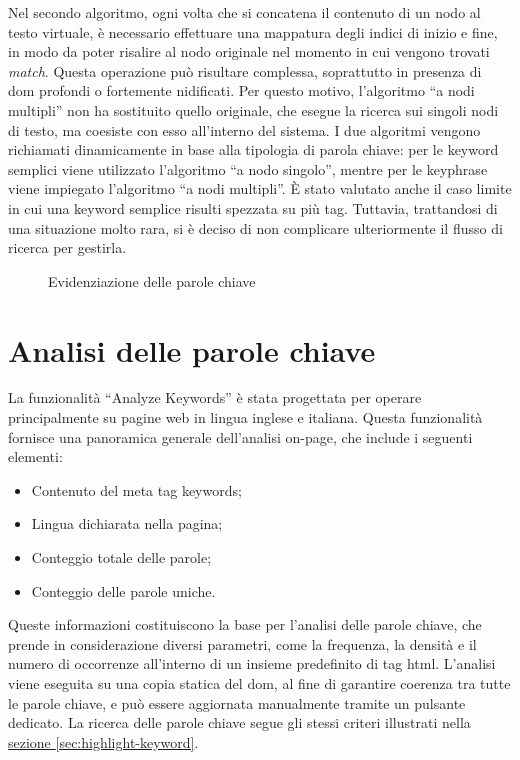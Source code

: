 \vspace{10pt}
\par\noindent Nel secondo algoritmo, ogni volta che si concatena il contenuto di un nodo al testo virtuale, è necessario effettuare una mappatura degli indici di inizio e fine, in modo da poter risalire al nodo originale nel momento in cui vengono trovati \textit{match}. Questa operazione può risultare complessa, soprattutto in presenza di \gls{dom} profondi o fortemente nidificati. Per questo motivo, l’algoritmo “a nodi multipli” non ha sostituito quello originale, che esegue la ricerca sui singoli nodi di testo, ma coesiste con esso all’interno del sistema. I due algoritmi vengono richiamati dinamicamente in base alla tipologia di parola chiave: per le keyword semplici viene utilizzato l’algoritmo “a nodo singolo”, mentre per le keyphrase viene impiegato l’algoritmo “a nodi multipli”. È stato valutato anche il caso limite in cui una keyword semplice risulti spezzata su più tag. Tuttavia, trattandosi di una situazione molto rara, si è deciso di non complicare ulteriormente il flusso di ricerca per gestirla.

\begin{figure}[H]
  \centering 
  \caption{Evidenziazione delle parole chiave}
\end{figure}

\section{Analisi delle parole chiave}
\label{sec:analyze-keyword}

\par La funzionalità “Analyze Keywords” è stata progettata per operare principalmente su pagine web in lingua inglese e italiana. Questa funzionalità fornisce una panoramica generale dell'analisi \gls{on-page}, che include i seguenti elementi:
\begin{itemize}
  \item Contenuto del meta tag keywords;
  \item Lingua dichiarata nella pagina;
  \item Conteggio totale delle parole;
  \item Conteggio delle parole uniche.
\end{itemize}

\vspace{5pt}
\par\noindent Queste informazioni costituiscono la base per l'analisi delle parole chiave, che prende in considerazione diversi parametri, come la frequenza, la densità e il numero di occorrenze all’interno di un insieme predefinito di tag \gls{html}. L'analisi viene eseguita su una copia statica del \gls{dom}, al fine di garantire coerenza tra tutte le parole chiave, e può essere aggiornata manualmente tramite un pulsante dedicato. La ricerca delle parole chiave segue gli stessi criteri illustrati nella \hyperref[sec:highlight-keyword]{sezione \textsection\ref*{sec:highlight-keyword}}.


